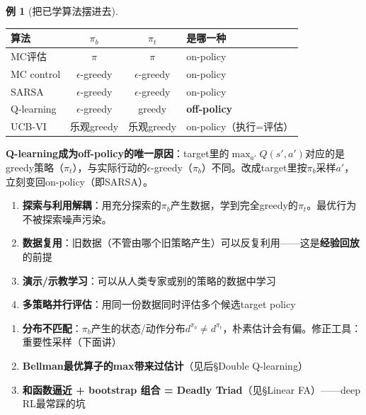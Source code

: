 \documentclass[11pt,a4paper]{article}
\theoremstyle{definition}
\newtheorem{example}{例}[section]
\begin{document}
\begin{example}[把已学算法摆进去]
\begin{center}
\begin{tabular}{l|c|c|l}
\toprule
算法 & $\pi_b$ & $\pi_t$ & 是哪一种 \\
\midrule
MC评估 & $\pi$ & $\pi$ & on-policy \\
MC control & $\epsilon$-greedy & $\epsilon$-greedy & on-policy \\
SARSA & $\epsilon$-greedy & $\epsilon$-greedy & on-policy \\
Q-learning & $\epsilon$-greedy & greedy & \textbf{off-policy} \\
UCB-VI & 乐观greedy & 乐观greedy & on-policy（执行=评估）\\
\bottomrule
\end{tabular}
\end{center}

\textbf{Q-learning成为off-policy的唯一原因}：target里的$\max_{a'} Q(s', a')$对应的是greedy策略（$\pi_t$），与实际行动的$\epsilon$-greedy（$\pi_b$）不同。改成target里按$\pi_b$采样$a'$，立刻变回on-policy（即SARSA）。
\end{example}

\begin{keypoint}
\begin{enumerate}
\item \textbf{探索与利用解耦}：用充分探索的$\pi_b$产生数据，学到完全greedy的$\pi_t$。最优行为不被探索噪声污染。
\item \textbf{数据复用}：旧数据（不管由哪个旧策略产生）可以反复利用——这是\textbf{经验回放}的前提
\item \textbf{演示/示教学习}：可以从人类专家或别的策略的数据中学习
\item \textbf{多策略并行评估}：用同一份数据同时评估多个候选target policy
\end{enumerate}
\end{keypoint}

\begin{keypoint}
\begin{enumerate}
\item \textbf{分布不匹配}：$\pi_b$产生的状态/动作分布$d^{\pi_b} \neq d^{\pi_t}$，朴素估计会有偏。修正工具：重要性采样（下面讲）
\item \textbf{Bellman最优算子的max带来过估计}（见后§Double Q-learning）
\item \textbf{和函数逼近 + bootstrap 组合 = Deadly Triad}（见§Linear FA）——deep RL最常踩的坑
\end{enumerate}
\end{keypoint}
\end{document}
